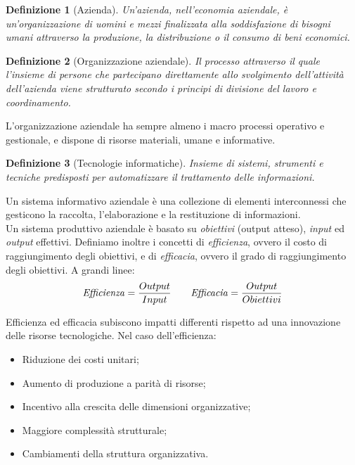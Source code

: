 \documentclass[a4paper, 10pt]{article}
\newtheorem{definit}{Definizione}[subsection]
\begin{document}
	\begin{definit}[Azienda]
		Un'azienda, nell'economia aziendale, è un'organizzazione di uomini e mezzi finalizzata alla soddisfazione di bisogni umani attraverso la produzione, la distribuzione o il consumo di beni economici.
	\end{definit}
	
	\begin{definit}[Organizzazione aziendale]
		Il processo attraverso il quale l'insieme di persone che partecipano direttamente allo svolgimento dell'attività dell'azienda viene strutturato secondo i principi di divisione del lavoro e coordinamento.
	\end{definit}
	L'organizzazione aziendale ha sempre almeno i macro processi operativo e gestionale, e dispone di risorse materiali, umane e informative.
	
	\begin{definit}[Tecnologie informatiche]
		Insieme di sistemi, strumenti e tecniche predisposti per automatizzare il trattamento delle informazioni.
	\end{definit}
	
	Un sistema informativo aziendale è una collezione di elementi interconnessi che gesticono la raccolta, l'elaborazione e la restituzione di informazioni. \\
	
	Un sistema produttivo aziendale è basato su \textit{obiettivi} (output atteso), \textit{input} ed \textit{output} effettivi. Definiamo inoltre i concetti di \textit{efficienza}, ovvero il costo di raggiungimento degli obiettivi, e di \textit{efficacia}, ovvero il grado di raggiungimento degli obiettivi. A grandi linee: \[ \text{\textit{Efficienza}} = \frac{Output}{Input} \qquad \text{\textit{Efficacia}} = \frac{Output}{Obiettivi}  \]
	
	Efficienza ed efficacia subiscono impatti differenti rispetto ad una innovazione delle risorse tecnologiche. Nel caso dell'efficienza: \begin{itemize}
		\item Riduzione dei costi unitari;
		\item Aumento di produzione a parità di risorse;
		\item Incentivo alla crescita delle dimensioni organizzative;
		\item Maggiore complessità strutturale;
		\item Cambiamenti della struttura organizzativa.
	\end{itemize}
	
\end{document}
